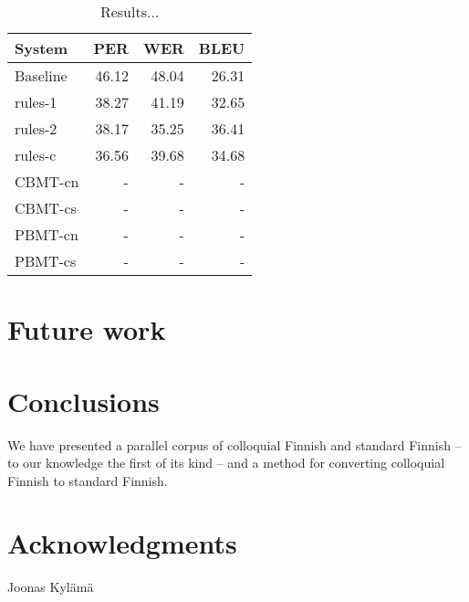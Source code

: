 \documentclass[11pt]{article}
\begin{document}
\begin{table}
  \centering
  \begin{tabular}{|l|r|r|r|}
     \hline
    \textbf{System} & \textbf{PER} & \textbf{WER} & \textbf{BLEU} \\
     \hline
     Baseline & 46.12 & 48.04 & 26.31 \\
     \hline
     rules-1 & 38.27 & 41.19 & 32.65 \\
     rules-2 & 38.17 & 35.25 & 36.41 \\
     rules-c & 36.56 & 39.68 & 34.68 \\
     \hline
     CBMT-cn & - & - & - \\
     CBMT-cs & - & - & - \\
     PBMT-cn & - & - & - \\
     PBMT-cs & - & - & - \\
     \hline
  \end{tabular}
  \label{table:results}
  \caption{Results...}
\end{table}

\section{Future work}

% 

\section{Conclusions}

We have presented a parallel corpus of colloquial Finnish and standard Finnish --
to our knowledge the first of its kind -- and a method for converting colloquial
Finnish to standard Finnish.


\section*{Acknowledgments}

Joonas Kyl\"{a}m\"{a}



\end{document}
